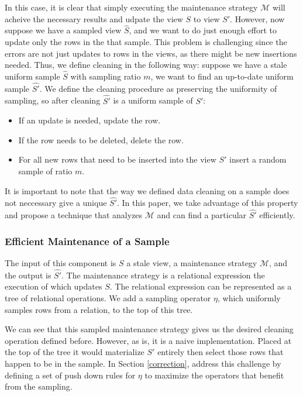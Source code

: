 In this case, it is clear that simply executing the maintenance strategy $\mathcal{M}$ will acheive the necessary results and udpate the view $S$ to view $S'$.
However, now suppose we have a sampled view $\hat{S}$, and we want to do just enough effort to update only the rows in the that sample.
This problem is challenging since the errors are not just updates to rows in the views, as there might be new insertions needed.
Thus, we define cleaning in the following way: suppose we have a stale uniform sample $\hat{S}$ with sampling ratio $m$, we want to find an up-to-date uniform sample $\hat{S'}$.
We define the cleaning procedure as preserving the uniformity of sampling, so after cleaning $\hat{S'}$ is a uniform sample of $S'$:
\begin{itemize}
\item If an update is needed, update the row.
\item If the row needs to be deleted, delete the row.
\item For all new rows that need to be inserted into the view $S'$ insert a random sample of ratio $m$.
\end{itemize}
It is important to note that the way we defined data cleaning on a sample does not neccessary give a unique $\hat{S'}$. 
In this paper, we take advantage of this property and propose a technique that analyzes $\mathcal{M}$ and can find a particular $\hat{S'}$
efficiently.

\subsubsection{Efficient Maintenance of a Sample}
The input of this component is $S$ a stale view, a maintenance strategy $\mathcal{M}$, and the output is $\hat{S'}$.
The maintenance strategy is a relational expression the execution of which updates $S$.
The relational expression can be represented as a tree of relational operations. 
We add a sampling operator $\eta$, which uniformly samples rows from a relation, to the top of this tree.

We can see that this sampled maintenance strategy gives us the desired cleaning operation defined before.
However, as is, it is a naive implementation.
Placed at the top of the tree it would materialize $S'$ entirely then select those rows that happen to be in the sample.
In Section \ref{correction}, address this challenge by defining a set of push down rules for $\eta$ to maximize the operators that benefit from the sampling.

